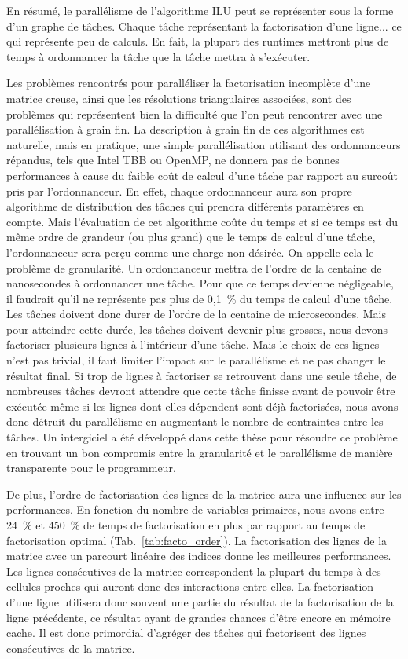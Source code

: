 En résumé, le parallélisme de l'algorithme ILU peut se représenter sous la forme d'un graphe de tâches.
%
Chaque tâche représentant la factorisation d'une ligne... ce qui représente peu de calculs.
%
En fait, la plupart des runtimes mettront plus de temps à ordonnancer la tâche que la tâche mettra à s'exécuter.

Les problèmes rencontrés pour paralléliser la factorisation incomplète d'une matrice creuse, ainsi que les résolutions triangulaires associées, sont des problèmes qui représentent bien la difficulté que l'on peut rencontrer avec une parallélisation à grain fin.
%
La description à grain fin de ces algorithmes est naturelle, mais en pratique, une simple parallélisation utilisant des ordonnanceurs répandus, tels que Intel TBB ou OpenMP, ne donnera pas de bonnes performances à cause du faible coût de calcul d'une tâche par rapport au surcoût pris par l'ordonnanceur.
%
En effet, chaque ordonnanceur aura son propre algorithme de distribution des tâches qui prendra différents paramètres en compte.
%
Mais l'évaluation de cet algorithme coûte du temps et si ce temps est du même ordre de grandeur (ou plus grand) que le temps de calcul d'une tâche, l'ordonnanceur sera perçu comme une charge non désirée.
%
On appelle cela le problème de granularité.
%
Un ordonnanceur mettra de l'ordre de la centaine de nanosecondes à ordonnancer une tâche.
%
Pour que ce temps devienne négligeable, il faudrait qu'il ne représente pas plus de 0,1~\% du temps de calcul d'une tâche.
%
Les tâches doivent donc durer de l'ordre de la centaine de microsecondes.
%
Mais pour atteindre cette durée, les tâches doivent devenir plus grosses, nous devons factoriser plusieurs lignes à l'intérieur d'une tâche.
%
Mais le choix de ces lignes n'est pas trivial, il faut limiter l'impact sur le parallélisme et ne pas changer le résultat final.
%
Si trop de lignes à factoriser se retrouvent dans une seule tâche, de nombreuses tâches devront attendre que cette tâche finisse avant de pouvoir être exécutée même si les lignes dont elles dépendent sont déjà factorisées, nous avons donc détruit du parallélisme en augmentant le nombre de contraintes entre les tâches.
%
Un intergiciel a été développé dans cette thèse pour résoudre ce problème en trouvant un bon compromis entre la granularité et le parallélisme de manière transparente pour le programmeur.

De plus, l'ordre de factorisation des lignes de la matrice aura une influence sur les performances.
%
En fonction du nombre de variables primaires, nous avons entre 24~\% et 450~\% de temps de factorisation en plus par rapport au temps de factorisation optimal (Tab.~\ref{tab:facto_order}).
%
La factorisation des lignes de la matrice avec un parcourt linéaire des indices donne les meilleures performances.
%
Les lignes consécutives de la matrice correspondent la plupart du temps à des cellules proches qui auront donc des interactions entre elles.
%
La factorisation d'une ligne utilisera donc souvent une partie du résultat de la factorisation de la ligne précédente, ce résultat ayant de grandes chances d'être encore en mémoire cache.
%
Il est donc primordial d'agréger des tâches qui factorisent des lignes consécutives de la matrice.

